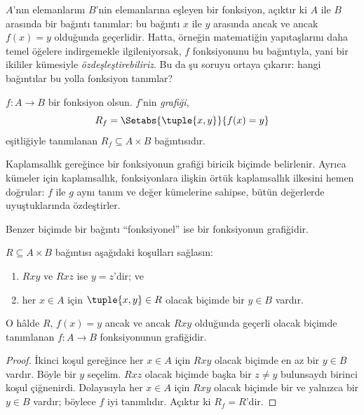 



\begin{explain}
$A$'nın elemanlarını $B$'nin elemanlarına eşleyen bir fonksiyon, açıktır ki
$A$ ile $B$ arasında bir bağıntı tanımlar: bu bağıntı $x$ ile $y$ arasında
ancak ve ancak $f(x)=y$ olduğunda geçerlidir. Hatta, örneğin matematiğin
yapıtaşlarını daha temel öğelere indirgemekle ilgileniyorsak, $f$
fonksiyonunu bu bağıntıyla, yani bir ikililer kümesiyle
\emph{özdeşleştirebiliriz}. Bu da şu soruyu ortaya çıkarır: hangi bağıntılar
bu yolla fonksiyon tanımlar?
\end{explain}

\begin{defn} $f\colon A \to B$ bir fonksiyon olsun.
$f$'nin \emph{grafiği},
\[
R_f = \Setabs{\tuple{x,y}}{f(x) = y}
\]
eşitliğiyle tanımlanan $R_f \subseteq A \times B$ bağıntısıdır.
\end{defn}

\begin{explain}
Kaplamsallık gereğince bir fonksiyonun grafiği biricik biçimde belirlenir.
Ayrıca kümeler için kaplamsallık, fonksiyonlara ilişkin örtük kaplamsallık
ilkesini hemen doğrular: $f$ ile $g$ aynı tanım ve değer kümelerine sahipse,
bütün değerlerde uyuştuklarında özdeştirler.

Benzer biçimde bir bağıntı ``fonksiyonel'' ise bir fonksiyonun grafiğidir.
\end{explain}

\begin{prop}
$R \subseteq A \times B$ bağıntısı aşağıdaki koşulları sağlasın:
\begin{enumerate}
\item $Rxy$ ve $Rxz$ ise $y=z$'dir; ve
\item her $x \in A$ için $\tuple{x,y}\in R$ olacak biçimde bir $y \in B$
vardır.
\end{enumerate}
O hâlde $R$, $f(x)=y$ ancak ve ancak $Rxy$ olduğunda geçerli olacak biçimde
tanımlanan $f\colon A \to B$ fonksiyonunun grafiğidir.
\end{prop}

\begin{proof}
İkinci koşul gereğince her $x \in A$ için $Rxy$ olacak biçimde en az bir
$y \in B$ vardır. Böyle bir $y$ seçelim. $Rxz$ olacak biçimde başka bir
$z\neq y$ bulunsaydı birinci koşul çiğnenirdi. Dolayısıyla her $x \in A$ için
$Rxy$ olacak biçimde bir ve yalnızca bir $y \in B$ vardır; böylece $f$ iyi
tanımlıdır. Açıktır ki $R_f=R$'dir.
\end{proof}

